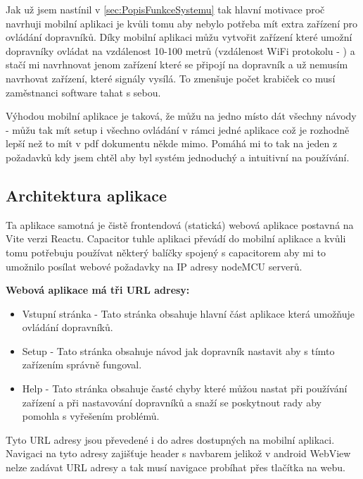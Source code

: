 Jak už jsem nastínil v \ref{sec:PopisFunkceSystemu} tak hlavní motivace proč navrhuji mobilní aplikaci je kvůli tomu aby nebylo potřeba mít extra zařízení pro ovládání dopravníků. Díky mobilní aplikaci můžu vytvořit zařízení které umožní dopravníky ovládat na vzdálenost 10-100 metrů (vzdálenost WiFi protokolu - ) a stačí mi navrhnovat jenom zařízení které se připojí na dopravník a už nemusím navrhovat zařízení, které signály vysílá. To zmenšuje počet krabiček co musí zaměstnanci software tahat s sebou.

Výhodou mobilní aplikace je taková, že můžu na jedno místo dát všechny návody - můžu tak mít setup i všechno ovládání v rámci jedné aplikace což je rozhodně lepší než to mít v pdf dokumentu někde mimo. Pomáhá mi to tak na jeden z požadavků kdy jsem chtěl aby byl systém jednoduchý a intuitivní na používání.

\subsection{Architektura aplikace}

Ta aplikace samotná je čistě frontendová (statická) webová aplikace postavná na Vite verzi Reactu. Capacitor tuhle aplikaci převádí do mobilní aplikace a kvůli tomu potřebuju používat některý balíčky spojený s capacitorem aby mi to umožnilo posílat webové požadavky na IP adresy nodeMCU serverů.

\textbf{Webová aplikace má tři URL adresy:}
\begin{itemize}
    \item Vstupní stránka - Tato stránka obsahuje hlavní část aplikace která umožňuje ovládání dopravníků.
    \item Setup - Tato stránka obsahuje návod jak dopravník nastavit aby s tímto zařízením správně fungoval.
    \item Help - Tato stránka obsahuje časté chyby které můžou nastat při používání zařízení a při nastavování dopravníků a snaží se poskytnout rady aby pomohla s vyřešením problémů.
\end{itemize}
Tyto URL adresy jsou převedené i do adres dostupných na mobilní aplikaci. Navigaci na tyto adresy zajišťuje header s navbarem jelikož v android WebView nelze zadávat URL adresy a tak musí navigace probíhat přes tlačítka na webu.

